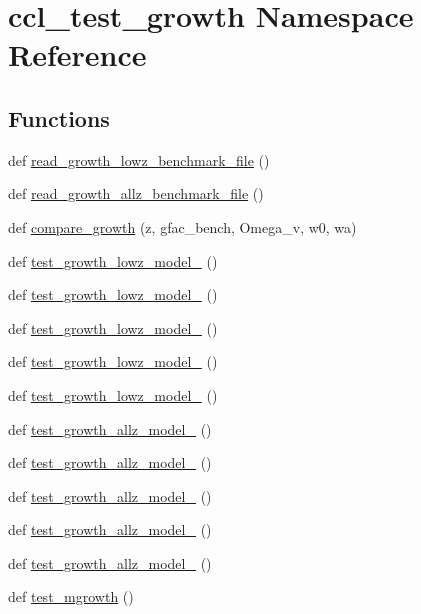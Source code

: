 \hypertarget{namespaceccl__test__growth}{}\section{ccl\+\_\+test\+\_\+growth Namespace Reference}
\label{namespaceccl__test__growth}
\subsection*{Functions}
\begin{DoxyCompactItemize}
\item 
def \mbox{\hyperlink{namespaceccl__test__growth_ac1171a8ec4ef57387a5b8ada42d58d7a}{read\+\_\+growth\+\_\+lowz\+\_\+benchmark\+\_\+file}} ()
\item 
def \mbox{\hyperlink{namespaceccl__test__growth_a2f8c205fa1a57bf8d2b31752e4798701}{read\+\_\+growth\+\_\+allz\+\_\+benchmark\+\_\+file}} ()
\item 
def \mbox{\hyperlink{namespaceccl__test__growth_aba020a4d3272ed9d9b03b9c6a1ffb452}{compare\+\_\+growth}} (z, gfac\+\_\+bench, Omega\+\_\+v, w0, wa)
\item 
def \mbox{\hyperlink{namespaceccl__test__growth_a37838dca6429b3ad372cb6f4e1607f02}{test\+\_\+growth\+\_\+lowz\+\_\+model\+\_}} ()
\item 
def \mbox{\hyperlink{namespaceccl__test__growth_a62a2adfaaf52c3522dad85aa3b077878}{test\+\_\+growth\+\_\+lowz\+\_\+model\+\_}} ()
\item 
def \mbox{\hyperlink{namespaceccl__test__growth_a59d1991b320004d1a7c84d4f6e1ecc60}{test\+\_\+growth\+\_\+lowz\+\_\+model\+\_}} ()
\item 
def \mbox{\hyperlink{namespaceccl__test__growth_abaf835d5b6bda8ea5af529151634f0d8}{test\+\_\+growth\+\_\+lowz\+\_\+model\+\_}} ()
\item 
def \mbox{\hyperlink{namespaceccl__test__growth_aace2d2e9356f024b35b6a0e6bfe16b20}{test\+\_\+growth\+\_\+lowz\+\_\+model\+\_}} ()
\item 
def \mbox{\hyperlink{namespaceccl__test__growth_abc7a6f255bc64edc4b8af6e8e98914f1}{test\+\_\+growth\+\_\+allz\+\_\+model\+\_}} ()
\item 
def \mbox{\hyperlink{namespaceccl__test__growth_a5d87ba3e86e28bed7f6916eb7ca3f54d}{test\+\_\+growth\+\_\+allz\+\_\+model\+\_}} ()
\item 
def \mbox{\hyperlink{namespaceccl__test__growth_ae53198dc05e94a55e99a5d24bf2f69b2}{test\+\_\+growth\+\_\+allz\+\_\+model\+\_}} ()
\item 
def \mbox{\hyperlink{namespaceccl__test__growth_afeb9f9f787f58ed05eec0682e11459e8}{test\+\_\+growth\+\_\+allz\+\_\+model\+\_}} ()
\item 
def \mbox{\hyperlink{namespaceccl__test__growth_ad4ab5faac417ef4cabecdb6feeed686c}{test\+\_\+growth\+\_\+allz\+\_\+model\+\_}} ()
\item 
def \mbox{\hyperlink{namespaceccl__test__growth_afedd7b6f40c09a4284691b608ca9326f}{test\+\_\+mgrowth}} ()
\end{DoxyCompactItemize}
